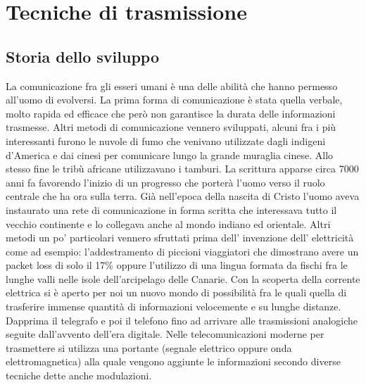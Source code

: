 \chapter{Tecniche di trasmissione}
\label{cha:intro}
\section{Storia dello sviluppo}
\label{sec:context}
 La comunicazione fra gli esseri umani è una delle abilità che hanno permesso all'uomo di evolversi. La prima forma di comunicazione è stata quella verbale, molto rapida ed efficace che però non garantisce la durata delle informazioni trasmesse. Altri metodi di comunicazione vennero sviluppati, alcuni fra i più interessanti furono le nuvole di fumo che venivano utilizzate dagli indigeni d'America e dai cinesi per comunicare lungo la grande muraglia cinese. Allo stesso fine le tribù africane utilizzavano i tamburi. La scrittura apparse circa 7000 anni fa favorendo l'inizio di un progresso che porterà l'uomo verso il ruolo centrale che ha ora sulla terra. Già nell'epoca della nascita di Cristo l'uomo aveva instaurato una rete di comunicazione in forma scritta che interessava tutto il vecchio continente e lo collegava anche al mondo indiano ed orientale. Altri metodi un po' particolari vennero sfruttati prima dell' invenzione dell' elettricità come ad esempio: l'addestramento di piccioni viaggiatori  che dimostrano avere un packet loss di solo il 17\% oppure l'utilizzo di una lingua formata da fischi fra le lunghe valli nelle isole dell'arcipelago delle Canarie.
Con la scoperta della corrente elettrica si è aperto per noi un nuovo mondo di possibilità fra le quali quella di trasferire immense quantità di informazioni velocemente e su lunghe distanze. Dapprima il telegrafo e poi il telefono fino ad arrivare alle trasmissioni analogiche seguite dall'avvento dell'era digitale. Nelle telecomunicazioni moderne per trasmettere si utilizza una portante (segnale elettrico oppure onda elettromagnetica) alla quale vengono aggiunte le informazioni secondo diverse tecniche dette anche modulazioni.


